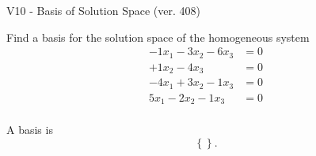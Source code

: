 \begin{exercise}
  \begin{exerciseTitle}V10 - Basis of Solution Space (ver. 408)\end{exerciseTitle}
  \begin{exerciseStatement}
    Find a basis for the solution space of the homogeneous system 
\begin{align*}
 -1 x_ 1 -3 x_ 2 -6 x_ 3 &= 0  \\ 
  + 1 x_ 2 -4 x_ 3 &= 0  \\ 
  -4 x_ 1 + 3 x_ 2 -1 x_ 3 &= 0  \\ 
  5 x_ 1 -2 x_ 2 -1 x_ 3 &= 0  \\ 
 \end{align*}


 
  \end{exerciseStatement}

  \begin{exerciseAnswer}
   A basis is   
\[\left\{\right\}.\]

  


  \end{exerciseAnswer}
\end{exercise}